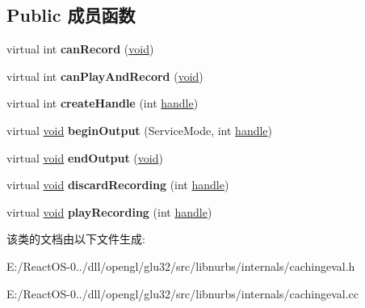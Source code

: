 \subsection*{Public 成员函数}
\begin{DoxyCompactItemize}
\item 
\mbox{\label{class_caching_evaluator_aa13e5ffb969858dfc92aaf4c7e6f8fe6}} 
virtual int {\bfseries can\+Record} (\hyperlink{interfacevoid}{void})
\item 
\mbox{\label{class_caching_evaluator_acd81249b05af4b42d8b6d44c752140ba}} 
virtual int {\bfseries can\+Play\+And\+Record} (\hyperlink{interfacevoid}{void})
\item 
\mbox{\label{class_caching_evaluator_a182d6c398f6a2f1273c91108fcdce971}} 
virtual int {\bfseries create\+Handle} (int \hyperlink{structhandle}{handle})
\item 
\mbox{\label{class_caching_evaluator_a6059de10319da60db0556ddcee954385}} 
virtual \hyperlink{interfacevoid}{void} {\bfseries begin\+Output} (Service\+Mode, int \hyperlink{structhandle}{handle})
\item 
\mbox{\label{class_caching_evaluator_a35bbe67548643b8c3767280236d57be3}} 
virtual \hyperlink{interfacevoid}{void} {\bfseries end\+Output} (\hyperlink{interfacevoid}{void})
\item 
\mbox{\label{class_caching_evaluator_afbab5a23982ed822f04f8a570ae42b2c}} 
virtual \hyperlink{interfacevoid}{void} {\bfseries discard\+Recording} (int \hyperlink{structhandle}{handle})
\item 
\mbox{\label{class_caching_evaluator_a91b314765ac54178e1828d88cc75aa4a}} 
virtual \hyperlink{interfacevoid}{void} {\bfseries play\+Recording} (int \hyperlink{structhandle}{handle})
\end{DoxyCompactItemize}


该类的文档由以下文件生成\+:\begin{DoxyCompactItemize}
\item 
E\+:/\+React\+O\+S-\/0../dll/opengl/glu32/src/libnurbs/internals/cachingeval.\+h\item 
E\+:/\+React\+O\+S-\/0../dll/opengl/glu32/src/libnurbs/internals/cachingeval.\+cc\end{DoxyCompactItemize}
